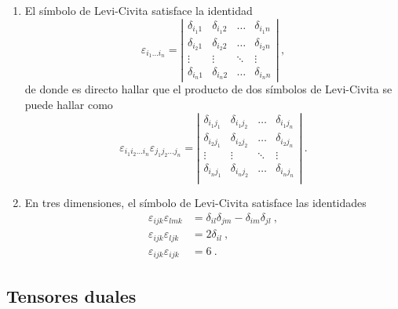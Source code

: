 \begin{propiedad}
\begin{enumerate}
        \item El símbolo de Levi-Civita satisface la identidad
        \begin{equation}
            \varepsilon_{i_1 \dots i_n} = \left| \begin{array}{cccc}
                \delta_{i_1 1} & \delta_{i_1 2} & \dots & \delta_{i_1 n} \\
                \delta_{i_2 1} & \delta_{i_2 2} & \dots & \delta_{i_2 n} \\
                \vdots & \vdots & \ddots & \vdots \\
                \delta_{i_n 1} & \delta_{i_n 2} & \dots & \delta_{i_n n} 
            \end{array} \right| \ ,
        \end{equation}
        de donde es directo hallar que el producto de dos símbolos de Levi-Civita se puede hallar como
    \begin{equation}
        \varepsilon_{i_1 i_2 \dots i_n} \varepsilon_{j_1 j_2 \dots j_n} = \left| \begin{array}{cccc}
            \delta_{i_1 j_1} & \delta_{i_1 j_2} & \dots & \delta_{i_1 j_n} \\
            \delta_{i_2 j_1} & \delta_{i_2 j_2} & \dots & \delta_{i_2 j_n} \\
            \vdots & \vdots & \ddots & \vdots \\
            \delta_{i_n j_1} & \delta_{i_n j_2} & \dots & \delta_{i_n j_n} \\
        \end{array}
        \right| \ .
    \end{equation}

    \item En tres dimensiones, el símbolo de Levi-Civita satisface las identidades
    \begin{align}
        \varepsilon_{ijk} \varepsilon_{lmk} & = \delta_{il} \delta_{jm} - \delta_{im} \delta_{jl} \ , \\
        \varepsilon_{ijk} \varepsilon_{ljk} & = 2 \delta_{il} \ , \\
        \varepsilon_{ijk} \varepsilon_{ijk} & = 6 \ .
    \end{align}
    
    \end{enumerate}
\end{propiedad}

\subsection{Tensores duales}

